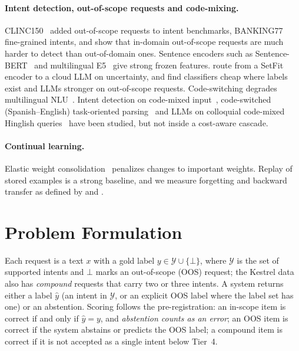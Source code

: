 \documentclass[11pt,a4paper]{article}
\begin{document}
\paragraph{Intent detection, out-of-scope requests and code-mixing.} CLINC150~\citep{larson2019clinc} added
out-of-scope requests to intent benchmarks, BANKING77~\citep{casanueva2020banking77} fine-grained intents, and
\citet{zhang2021idoos} show that in-domain out-of-scope requests are much harder to detect than out-of-domain ones. Sentence encoders such as
Sentence-BERT~\citep{reimers2019sbert} and multilingual E5~\citep{wang2024me5} give strong frozen features.
\citet{arora2024intentllm} route from a SetFit encoder to a cloud LLM on uncertainty, and
\citet{rodrigues2026llmvsnlu} find classifiers cheap where labels exist and LLMs stronger on out-of-scope requests.
Code-switching degrades multilingual NLU~\citep{birshert2021larisa}. Intent detection on code-mixed
input~\citep{jayarao2018codemix}, code-switched (Spanish--English) task-oriented parsing~\citep{einolghozati2021cstop} and LLMs on
colloquial code-mixed Hinglish queries~\citep{dey2026hinglishsrh} have been studied, but not inside a cost-aware cascade.

\paragraph{Continual learning.} Elastic weight consolidation~\citep{kirkpatrick2017ewc} penalizes changes to important
weights. Replay of stored examples is a strong baseline, and we measure forgetting and backward transfer as defined by
\citet{chaudhry2018riemannian} and \citet{lopezpaz2017gem}.

\section{Problem Formulation}\label{sec:problem}

Each request is a text $x$ with a gold label $y\in\mathcal{Y}\cup\{\bot\}$, where $\mathcal{Y}$ is the set of supported
intents and $\bot$ marks an out-of-scope (OOS) request; the Kestrel data also has \emph{compound} requests that carry two or
three intents. A system returns either a label $\hat y$ (an intent in $\mathcal{Y}$, or an explicit OOS label where the
label set has one) or an abstention.
Scoring follows the pre-registration: an in-scope item is correct if and only if $\hat y=y$, and \emph{abstention counts
as an error}; an OOS item is correct if the system abstains or predicts the OOS label; a compound item is correct if it
is not accepted as a single intent below Tier~4.
\end{document}
